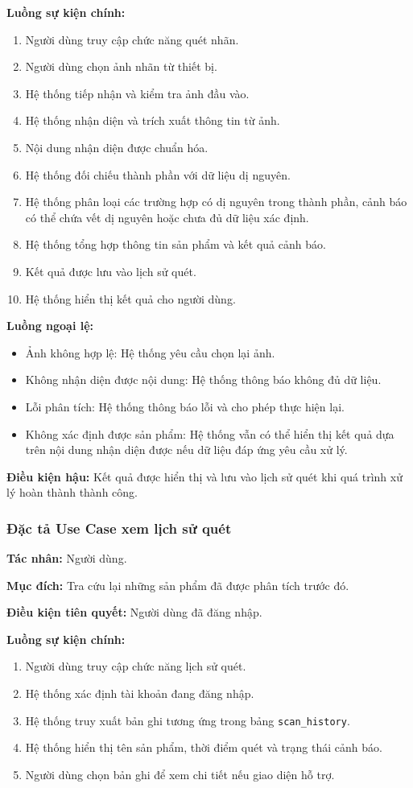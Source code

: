 \textbf{Luồng sự kiện chính:}
\begin{enumerate}
	\item Người dùng truy cập chức năng quét nhãn.
	\item Người dùng chọn ảnh nhãn từ thiết bị.
	\item Hệ thống tiếp nhận và kiểm tra ảnh đầu vào.
	\item Hệ thống nhận diện và trích xuất thông tin từ ảnh.
	\item Nội dung nhận diện được chuẩn hóa.
	\item Hệ thống đối chiếu thành phần với dữ liệu dị nguyên.
	\item Hệ thống phân loại các trường hợp có dị nguyên trong thành phần, cảnh báo có thể chứa vết dị nguyên hoặc chưa đủ dữ liệu xác định.
	\item Hệ thống tổng hợp thông tin sản phẩm và kết quả cảnh báo.
	\item Kết quả được lưu vào lịch sử quét.
	\item Hệ thống hiển thị kết quả cho người dùng.
\end{enumerate}

\textbf{Luồng ngoại lệ:}
\begin{itemize}
	\item Ảnh không hợp lệ: Hệ thống yêu cầu chọn lại ảnh.
	\item Không nhận diện được nội dung: Hệ thống thông báo không đủ dữ liệu.
	\item Lỗi phân tích: Hệ thống thông báo lỗi và cho phép thực hiện lại.
	\item Không xác định được sản phẩm: Hệ thống vẫn có thể hiển thị kết quả dựa trên nội dung nhận diện được nếu dữ liệu đáp ứng yêu cầu xử lý.
\end{itemize}

\textbf{Điều kiện hậu:} Kết quả được hiển thị và lưu vào lịch sử quét khi quá trình xử lý hoàn thành thành công.

\subsubsection{Đặc tả Use Case xem lịch sử quét}

\textbf{Tác nhân:} Người dùng.

\textbf{Mục đích:} Tra cứu lại những sản phẩm đã được phân tích trước đó.

\textbf{Điều kiện tiên quyết:} Người dùng đã đăng nhập.

\textbf{Luồng sự kiện chính:}
\begin{enumerate}
	\item Người dùng truy cập chức năng lịch sử quét.
	\item Hệ thống xác định tài khoản đang đăng nhập.
	\item Hệ thống truy xuất bản ghi tương ứng trong bảng \texttt{scan\_history}.
	\item Hệ thống hiển thị tên sản phẩm, thời điểm quét và trạng thái cảnh báo.
	\item Người dùng chọn bản ghi để xem chi tiết nếu giao diện hỗ trợ.
\end{enumerate}

